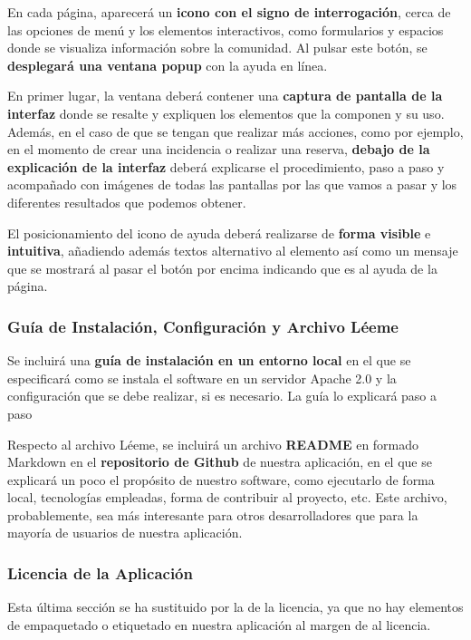En cada página, aparecerá un \textbf{icono con el signo de interrogación}, cerca de las opciones de menú y los elementos interactivos, como formularios y espacios donde se visualiza información sobre la comunidad. Al pulsar este botón, se \textbf{desplegará una ventana popup} con la ayuda en línea. 

En primer lugar, la ventana deberá contener una \textbf{captura de pantalla de la interfaz} donde se resalte y expliquen los elementos que la componen y su uso. Además, en el caso de que se tengan que realizar más acciones, como por ejemplo, en el momento de crear una incidencia o realizar una reserva, \textbf{debajo de la explicación de la interfaz} deberá explicarse el procedimiento, paso a paso y acompañado con imágenes de todas las pantallas por las que vamos a pasar y los diferentes resultados que podemos obtener. 

El posicionamiento del icono de ayuda deberá realizarse de \textbf{forma visible} e \textbf{intuitiva}, añadiendo además textos alternativo al elemento así como un mensaje que se mostrará al pasar el botón por encima indicando que es al ayuda de la página. 																																					

\subsubsection{Guía de Instalación, Configuración y Archivo Léeme} 
Se incluirá una \textbf{guía de instalación en un entorno local} en el que se especificará como se instala el software en un servidor Apache 2.0 y la configuración que se debe realizar, si es necesario. La guía lo explicará paso a paso 

Respecto al archivo Léeme, se incluirá un archivo \textbf{README} en formado \gls{Markdown} en el \textbf{repositorio de Github} de nuestra aplicación, en el que se explicará un poco el propósito de nuestro software, como ejecutarlo de forma local, tecnologías empleadas, forma de contribuir al proyecto, etc. Este archivo, probablemente, sea más interesante para otros desarrolladores que para la mayoría de usuarios de nuestra aplicación.

\subsubsection{Licencia de la Aplicación}
Esta última sección se ha sustituido por la de la licencia, ya que no hay elementos de empaquetado  o etiquetado en nuestra aplicación al margen de al licencia.

